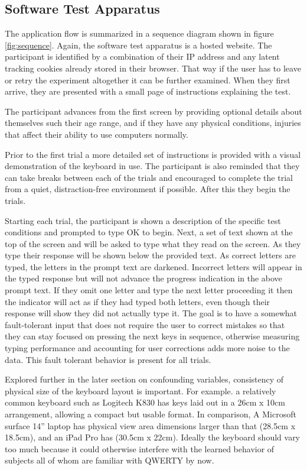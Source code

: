 \documentclass[english]{vgtc}
\begin{document}
\subsection{Software Test Apparatus}

The application flow is summarized in a sequence diagram shown in figure \ref{fig:sequence}. Again, the software test apparatus is a hosted website. The participant is identified by a combination of their IP address and any latent tracking
cookies already stored in their browser.  That way if the user has to leave
or retry the experiment altogether it can be further examined.
When they first arrive, they are presented with a small page of 
instructions explaining the test.

The participant advances from the first screen by providing optional details 
about themselves such their age range, and if they have any physical conditions, injuries that affect their ability to use computers normally.

Prior to the first trial a more detailed set of instructions is provided
with a visual demonstration of the keyboard in use. The participant is also
reminded that they can take breaks between each of the trials and encouraged
to complete the trial from a quiet, distraction-free environment if possible.
After this they begin the trials.

Starting each trial, the participant is shown a description of the specific
test conditions and prompted to type OK to begin.  Next, a set of text shown at 
the top of the screen and will be asked to type what they read on the screen. 
As they type their response will be shown below the provided text. As correct
letters are typed, the letters in the prompt text are darkened. Incorrect letters
will appear in the typed response but will not advance the progress indication
in the above prompt text.  If they omit one letter and type the next letter proceeding it then the indicator will act as if they had typed both letters, even though their response will show they did not actually type it.  The goal is to have a somewhat
fault-tolerant input that does not require the user to correct mistakes so
that they can stay focused on pressing the next keys in sequence, otherwise
measuring typing performance and accounting for user corrections adds
more noise to the data. This fault tolerant behavior is present
for all trials. 

Explored further in the later section on confounding
variables, consistency of physical size of the keyboard layout is
important. For example. a relatively common keyboard such as Logitech K830 
has keys laid out in a 26cm x 10cm arrangement, allowing a compact but usable format. 
In comparison, A Microsoft surface 14\textquotedblright{} laptop has physical view area dimensions larger than that (28.5cm x 18.5cm), and an iPad Pro has (30.5cm x 22cm). Ideally the keyboard should vary too much because it could otherwise interfere with
the learned behavior of subjects all of whom are familiar with QWERTY by now.
\end{document}
